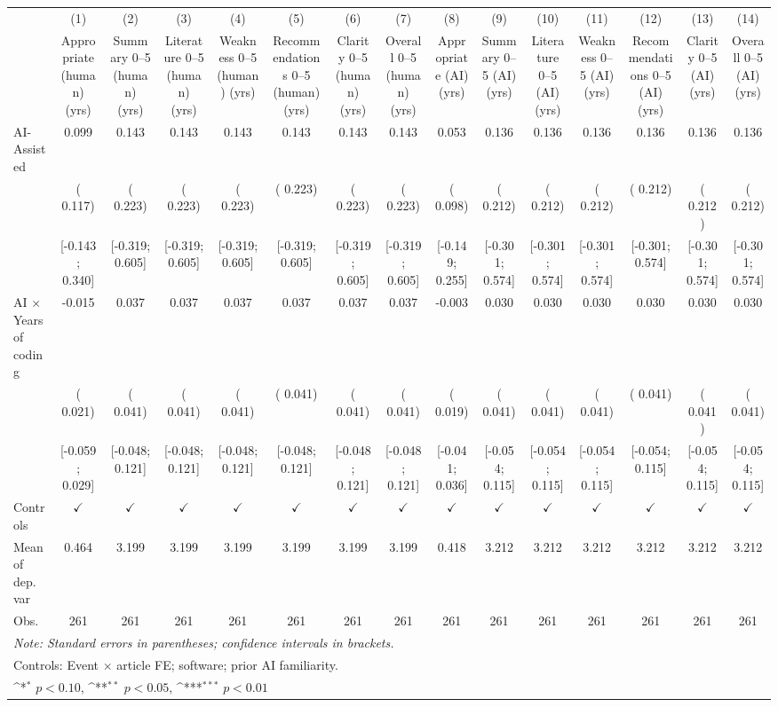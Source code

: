 \def\sym#1{\ifmmode^{#1}\else\(^{#1}\)\fi}
\begin{tabular}{l*{14}{c}}
\hline\hline
 & (1) & (2) & (3) & (4) & (5) & (6) & (7) & (8) & (9) & (10) & (11) & (12) & (13) & (14)
\\
 & Appropriate (human) (yrs) & Summary 0–5 (human) (yrs) & Literature 0–5 (human) (yrs) & Weakness 0–5 (human) (yrs) & Recommendations 0–5 (human) (yrs) & Clarity 0–5 (human) (yrs) & Overall 0–5 (human) (yrs) & Appropriate (AI) (yrs) & Summary 0–5 (AI) (yrs) & Literature 0–5 (AI) (yrs) & Weakness 0–5 (AI) (yrs) & Recommendations 0–5 (AI) (yrs) & Clarity 0–5 (AI) (yrs) & Overall 0–5 (AI) (yrs)
 \\
\hline
AI-Assisted &  0.099 &  0.143 &  0.143 &  0.143 &  0.143 &  0.143 &  0.143 &  0.053 &  0.136 &  0.136 &  0.136 &  0.136 &  0.136 &  0.136
\\
 & ( 0.117) & ( 0.223) & ( 0.223) & ( 0.223) & ( 0.223) & ( 0.223) & ( 0.223) & ( 0.098) & ( 0.212) & ( 0.212) & ( 0.212) & ( 0.212) & ( 0.212) & ( 0.212)
\\
 & [-0.143;  0.340] & [-0.319;  0.605] & [-0.319;  0.605] & [-0.319;  0.605] & [-0.319;  0.605] & [-0.319;  0.605] & [-0.319;  0.605] & [-0.149;  0.255] & [-0.301;  0.574] & [-0.301;  0.574] & [-0.301;  0.574] & [-0.301;  0.574] & [-0.301;  0.574] & [-0.301;  0.574]
\\
AI × Years of coding & -0.015 &  0.037 &  0.037 &  0.037 &  0.037 &  0.037 &  0.037 & -0.003 &  0.030 &  0.030 &  0.030 &  0.030 &  0.030 &  0.030
\\
 & ( 0.021) & ( 0.041) & ( 0.041) & ( 0.041) & ( 0.041) & ( 0.041) & ( 0.041) & ( 0.019) & ( 0.041) & ( 0.041) & ( 0.041) & ( 0.041) & ( 0.041) & ( 0.041)
\\
 & [-0.059;  0.029] & [-0.048;  0.121] & [-0.048;  0.121] & [-0.048;  0.121] & [-0.048;  0.121] & [-0.048;  0.121] & [-0.048;  0.121] & [-0.041;  0.036] & [-0.054;  0.115] & [-0.054;  0.115] & [-0.054;  0.115] & [-0.054;  0.115] & [-0.054;  0.115] & [-0.054;  0.115]
\\
\hline
Controls & $\checkmark$ & $\checkmark$ & $\checkmark$ & $\checkmark$ & $\checkmark$ & $\checkmark$ & $\checkmark$ & $\checkmark$ & $\checkmark$ & $\checkmark$ & $\checkmark$ & $\checkmark$ & $\checkmark$ & $\checkmark$
\\
Mean of dep. var &  0.464 &  3.199 &  3.199 &  3.199 &  3.199 &  3.199 &  3.199 &  0.418 &  3.212 &  3.212 &  3.212 &  3.212 &  3.212 &  3.212
\\
Obs. & 261 & 261 & 261 & 261 & 261 & 261 & 261 & 261 & 261 & 261 & 261 & 261 & 261 & 261
\\
\hline
\hline\hline
\multicolumn{15}{l}{\it{Note:} Standard errors in parentheses; confidence intervals in brackets.}\\
\multicolumn{15}{l}{Controls: Event $\times$ article FE; software; prior AI familiarity.}\\
\multicolumn{15}{l}{\sym{*} $p<0.10$, \sym{**} $p<0.05$,  \sym{***} $p<0.01$}\\
\end{tabular}
